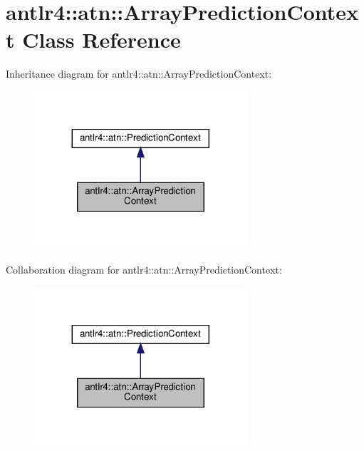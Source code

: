 \hypertarget{classantlr4_1_1atn_1_1ArrayPredictionContext}{}\section{antlr4\+:\+:atn\+:\+:Array\+Prediction\+Context Class Reference}
\label{classantlr4_1_1atn_1_1ArrayPredictionContext}


Inheritance diagram for antlr4\+:\+:atn\+:\+:Array\+Prediction\+Context\+:
\nopagebreak
\begin{figure}[H]
\begin{center}
\leavevmode
\includegraphics[width=224pt]{classantlr4_1_1atn_1_1ArrayPredictionContext__inherit__graph}
\end{center}
\end{figure}


Collaboration diagram for antlr4\+:\+:atn\+:\+:Array\+Prediction\+Context\+:
\nopagebreak
\begin{figure}[H]
\begin{center}
\leavevmode
\includegraphics[width=224pt]{classantlr4_1_1atn_1_1ArrayPredictionContext__coll__graph}
\end{center}
\end{figure}
